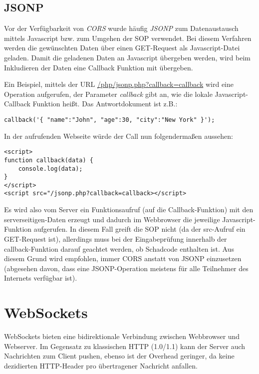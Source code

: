 \subsection{JSONP}

Vor der Verfügbarkeit von \textit{CORS} wurde häufig \textit{JSONP} zum Datenaustausch mittels Javascript bzw. zum Umgehen der SOP verwendet. Bei diesem Verfahren werden die gewünschten Daten über einen GET-Request als Javascript-Datei geladen. Damit die geladenen Daten an Javascript übergeben werden, wird beim Inkludieren der Daten eine Callback Funktion mit übergeben.

Ein Beispiel, mittels der URL \url{/php/jsonp.php?callback=callback} wird eine Operation aufgerufen, der Parameter \textit{callback} gibt an, wie die lokale Javascript-Callback Funktion heißt. Das Antwortdokument ist z.B.:

\begin{verbatim}
callback('{ "name":"John", "age":30, "city":"New York" }');
\end{verbatim}

In der aufrufenden Webseite würde der Call nun folgendermaßen aussehen:

\begin{verbatim}
<script>
function callback(data) {
	console.log(data);
}
</script>
<script src="/jsonp.php?callback=callback></script>
\end{verbatim}

Es wird also vom Server ein Funktionsaufruf (auf die Callback-Funktion) mit den serverseitigen-Daten erzeugt und dadurch im Webbrowser die jeweilige Javascript-Funktion aufgerufen. In diesem Fall greift die SOP nicht (da der src-Aufruf ein GET-Request ist), allerdings muss bei der Eingabeprüfung innerhalb der callback-Funktion darauf geachtet werden, ob Schadcode enthalten ist. Aus diesem Grund wird empfohlen, immer CORS anstatt von JSONP einzusetzen (abgesehen davon, dass eine JSONP-Operation meistens für alle Teilnehmer des Internets verfügbar ist).

\section{WebSockets} 

WebSockets bieten eine bidirektionale Verbindung zwischen Webbrowser und Webserver. Im Gegensatz zu klassischen HTTP (1.0/1.1) kann der Server auch Nachrichten zum Client pushen, ebenso ist der Overhead geringer, da keine dezidierten HTTP-Header pro übertragener Nachricht anfallen.

